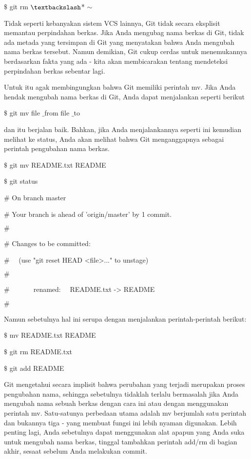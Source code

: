 \noindent 
 $  \$  $ git rm  $  \textbackslash  $* $  \sim  $ \par
\noindent 
Tidak seperti kebanyakan sistem VCS lainnya, Git tidak secara eksplisit memantau perpindahan berkas. Jika Anda mengubag nama berkas di Git, tidak ada metada yang tersimpan di Git yang menyatakan bahwa Anda mengubah nama berkas tersebut. Namun demikian, Git cukup cerdas untuk menemukannya berdasarkan fakta yang ada - kita akan membicarakan tentang mendeteksi perpindahan berkas sebentar lagi. \par
\noindent 
Untuk itu agak membingungkan bahwa Git memiliki perintah mv. Jika Anda hendak mengubah nama berkas di Git, Anda dapat menjalankan seperti berikut \par
\noindent 
 $  \$  $ git mv file $  \_  $from file $  \_  $to \par
\noindent 
dan itu berjalan baik. Bahkan, jika Anda menjalankannya seperti ini kemudian melihat ke status, Anda akan melihat bahwa Git menganggapnya sebagai perintah pengubahan nama berkas.  \par
\noindent 
 $  \$  $ git mv README.txt README \par
\noindent 
 $  \$  $ git status \par
\noindent 
 $  \#  $ On branch master \par
\noindent 
 $  \#  $ Your branch is ahead of 'origin/master' by 1 commit. \par
\noindent 
 $  \#  $ \par
\noindent 
 $  \#  $ Changes to be committed: \par
\noindent 
 $  \#  $~~ (use "git reset HEAD <file>..." to unstage) \par
\noindent 
 $  \#  $ \par
\noindent 
 $  \#  $~~~~~~~renamed:~~  README.txt -> README \par
\noindent 
 $  \#  $ \par
\noindent 
Namun sebetulnya hal ini serupa dengan menjalankan perintah-perintah berikut: \par
\noindent 
 $  \$  $ mv README.txt README \par
\noindent 
 $  \$  $ git rm README.txt \par
\noindent 
 $  \$  $ git add README \par
\noindent 
Git mengetahui secara implisit bahwa perubahan yang terjadi merupakan proses pengubahan nama, sehingga sebetulnya tidaklah terlalu bermasalah jika Anda mengubah nama sebuah berkas dengan cara ini atau dengan menggunakan perintah mv. Satu-satunya perbedaan utama adalah mv berjumlah satu perintah dan bukannya tiga - yang membuat fungsi ini lebih nyaman digunakan. Lebih penting lagi, Anda sebetulnya dapat menggunakan alat apapun yang Anda suka untuk mengubah nama berkas, tinggal tambahkan perintah add/rm di bagian akhir, sesaat sebelum Anda melakukan commit. \par
\vspace{12pt}
\vspace{12pt}
\vspace{12pt}
\vspace{12pt}

